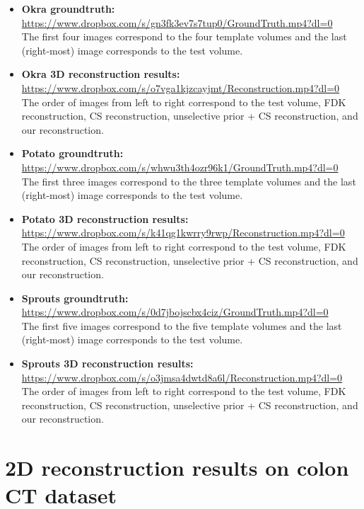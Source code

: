 \documentclass{article}
\begin{document}
\begin{itemize}
\item \textbf{Okra groundtruth:} \\ \url{https://www.dropbox.com/s/gn3fk3ev7s7tup0/GroundTruth.mp4?dl=0}\\
	The first four images correspond to the four template volumes and the last (right-most) image corresponds to the test volume.
\item \textbf{Okra 3D reconstruction results:} \\ \url{https://www.dropbox.com/s/o7vga1kjzcayjmt/Reconstruction.mp4?dl=0}\\
       The order of images from left to right correspond to the test volume, FDK reconstruction, CS reconstruction, unselective prior + CS reconstruction, and our reconstruction. 
\item \textbf{Potato groundtruth:} \\ \url{https://www.dropbox.com/s/whwu3th4ozr96k1/GroundTruth.mp4?dl=0}\\
	The first three images correspond to the three template volumes and the last (right-most) image corresponds to the test volume.
\item \textbf{Potato 3D reconstruction results:}\\  \url{https://www.dropbox.com/s/k41qg1kwrry9rwp/Reconstruction.mp4?dl=0}\\
       The order of images from left to right correspond to the test volume, FDK reconstruction, CS reconstruction, unselective prior + CS reconstruction, and our reconstruction.
\item \textbf{Sprouts groundtruth:} \\ \url{https://www.dropbox.com/s/0d7jbojscbx4ciz/GroundTruth.mp4?dl=0}\\
	The first five images correspond to the five template volumes and the last (right-most) image corresponds to the test volume.
\item \textbf{Sprouts 3D reconstruction results:}\\  \url{https://www.dropbox.com/s/o3jmsa4dwtd8a6l/Reconstruction.mp4?dl=0}\\
       The order of images from left to right correspond to the test volume, FDK reconstruction, CS reconstruction, unselective prior + CS reconstruction, and our reconstruction.

\end{itemize}

\newpage
\section{2D reconstruction results on colon CT dataset}
\end{document}
